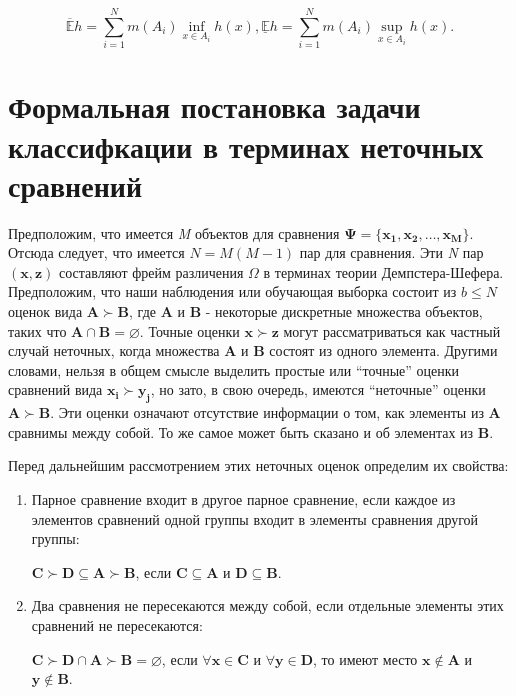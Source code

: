 \documentclass[12pt,a4paper,oneside]{article}
\begin{document}
\[
\mathbb{\overline{E}} h = \sum \limits_{i=1}^N m(A_i) \inf_{x \in A_i} h(x), 
\mathbb{\underline{E}} h = \sum \limits_{i=1}^N m(A_i) \sup_{x \in A_i} h(x).
\]


\section{Формальная постановка задачи классифкации в терминах неточных сравнений}
\label{sec:classification_problem_by_imprecise_comparisons}

\par
Предположим, что имеется \emph{M} объектов для сравнения \(\mathbf{\Psi} = \{\mathbf{x_1}, \mathbf{x_2}, \dots, \mathbf{x_M}\}\). 
Отсюда следует, что имеется \(N = M(M - 1)\) пар для сравнения. 
Эти \emph{N} пар \((\mathbf{x}, \mathbf{z})\) составляют фрейм различения \(\Omega\) в терминах теории Демпстера-Шефера. 
Предположим, что наши наблюдения или обучающая выборка состоит из \(b \leq N\) оценок вида \(\mathbf{A} \succ \mathbf{B}\), где \(\mathbf{A}\) и \(\mathbf{B}\) - некоторые дискретные множества объектов, таких что \(\mathbf{A} \cap \mathbf{B} = \varnothing\).  
Точные оценки \(\mathbf{x} \succ \mathbf{z}\) могут рассматриваться как частный случай неточных, когда множества \(\mathbf{A}\) и \(\mathbf{B}\) состоят из одного элемента. 
Другими словами, нельзя в общем смысле выделить простые или ``точные'' оценки сравнений вида \(\mathbf{x_i} \succ \mathbf{y_j}\), но зато, в свою очередь, имеются ``неточные'' оценки \(\mathbf{A} \succ \mathbf{B}\). 
Эти оценки означают отсутствие информации о том, как элементы из \(\mathbf{A}\) сравнимы между собой. 
То же самое может быть сказано и об элементах из \(\mathbf{B}\). 

\par
Перед дальнейшим рассмотрением этих неточных оценок определим их свойства:

\begin{enumerate}
\item Парное сравнение входит в другое парное сравнение, если каждое из элементов сравнений одной группы входит в элементы сравнения другой группы:

\begin{center}
\(\mathbf{C} \succ \mathbf{D} \subseteq \mathbf{A} \succ \mathbf{B}\), если \(\mathbf{C} \subseteq \mathbf{A}\) и \(\mathbf{D} \subseteq \mathbf{B}\).
\end{center}

\item Два сравнения не пересекаются между собой, если отдельные элементы этих сравнений не пересекаются:

\begin{center}
\(\mathbf{C} \succ \mathbf{D} \cap \mathbf{A} \succ \mathbf{B} = \varnothing\), если \(\forall\mathbf{x} \in \mathbf{C}\) и \(\forall\mathbf{y} \in \mathbf{D}\), то имеют место \(\mathbf{x} \notin \mathbf{A}\) и \(\mathbf{y} \notin \mathbf{B}\).
\end{center}

\end{enumerate}
\end{document}
